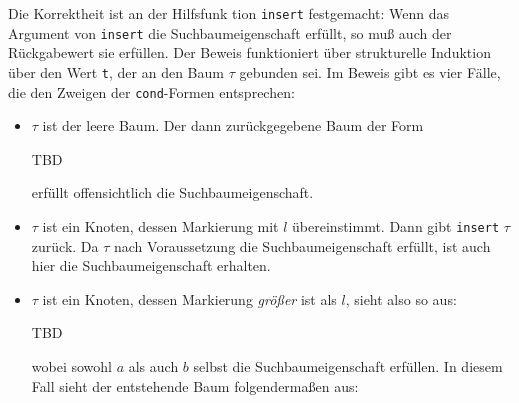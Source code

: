 \begin{beweis}
  Die Korrektheit ist an der Hilfsfunk tion \texttt{insert}
  festgemacht: Wenn das Argument von \texttt{insert} die
  Suchbaumeigenschaft erfüllt, so muß auch der Rückgabewert sie
  erfüllen.  Der Beweis funktioniert über strukturelle Induktion über
  den Wert \texttt{t}, der an den Baum $\tau$ gebunden sei.  Im
  Beweis gibt es vier Fälle, die den Zweigen der \texttt{cond}-Formen
  entsprechen:
%
\begin{itemize}
\item $\tau$ ist der leere Baum.  Der dann zurückgegebene Baum
  der Form

  TBD
  
erfüllt offensichtlich die Suchbaumeigenschaft.
\item $\tau$ ist ein Knoten, dessen Markierung mit
  $l$ übereinstimmt.  Dann gibt \texttt{insert} 
  $\tau$ zurück.  Da $\tau$ nach Voraussetzung die
  Suchbaumeigenschaft erfüllt, ist auch hier die
  Suchbaumeigenschaft erhalten.
\item $\tau$ ist ein Knoten, dessen Markierung \emph{größer}
  ist als $l$, sieht also so aus:

  TBD
  
  wobei sowohl $a$ als auch $b$ selbst die Suchbaumeigenschaft
  erfüllen. In diesem
  Fall sieht der entstehende Baum folgendermaßen aus:


\end{itemize}
\end{beweis}
